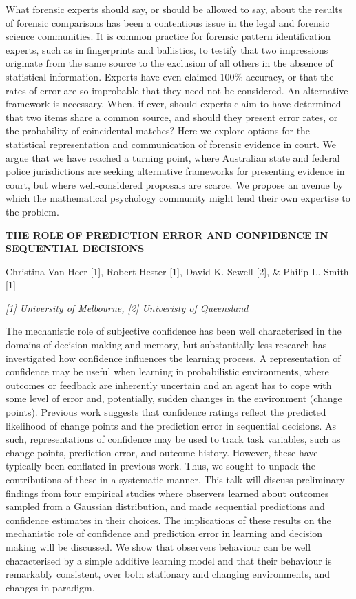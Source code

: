 \documentclass[]{article}
\begin{document}
What forensic experts should say, or should be allowed to say, about the
results of forensic comparisons has been a contentious issue in the
legal and forensic science communities. It is common practice for
forensic pattern identification experts, such as in fingerprints and
ballistics, to testify that two impressions originate from the same
source to the exclusion of all others in the absence of statistical
information. Experts have even claimed 100\% accuracy, or that the rates
of error are so improbable that they need not be considered. An
alternative framework is necessary. When, if ever, should experts claim
to have determined that two items share a common source, and should they
present error rates, or the probability of coincidental matches? Here we
explore options for the statistical representation and communication of
forensic evidence in court. We argue that we have reached a turning
point, where Australian state and federal police jurisdictions are
seeking alternative frameworks for presenting evidence in court, but
where well-considered proposals are scarce. We propose an avenue by
which the mathematical psychology community might lend their own
expertise to the problem.

\textbf{THE ROLE OF PREDICTION ERROR AND CONFIDENCE IN SEQUENTIAL
DECISIONS }

Christina Van Heer {[}1{]}, Robert Hester {[}1{]}, David K. Sewell
{[}2{]}, \& Philip L. Smith {[}1{]}

\emph{{[}1{]} University of Melbourne, {[}2{]} Univeristy of Queensland}

The mechanistic role of subjective confidence has been well
characterised in the domains of decision making and memory, but
substantially less research has investigated how confidence influences
the learning process. A representation of confidence may be useful when
learning in probabilistic environments, where outcomes or feedback are
inherently uncertain and an agent has to cope with some level of error
and, potentially, sudden changes in the environment (change points).
Previous work suggests that confidence ratings reflect the predicted
likelihood of change points and the prediction error in sequential
decisions. As such, representations of confidence may be used to track
task variables, such as change points, prediction error, and outcome
history. However, these have typically been conflated in previous work.
Thus, we sought to unpack the contributions of these in a systematic
manner. This talk will discuss preliminary findings from four empirical
studies where observers learned about outcomes sampled from a Gaussian
distribution, and made sequential predictions and confidence estimates
in their choices. The implications of these results on the mechanistic
role of confidence and prediction error in learning and decision making
will be discussed. We show that observers behaviour can be well
characterised by a simple additive learning model and that their
behaviour is remarkably consistent, over both stationary and changing
environments, and changes in paradigm.
\end{document}
